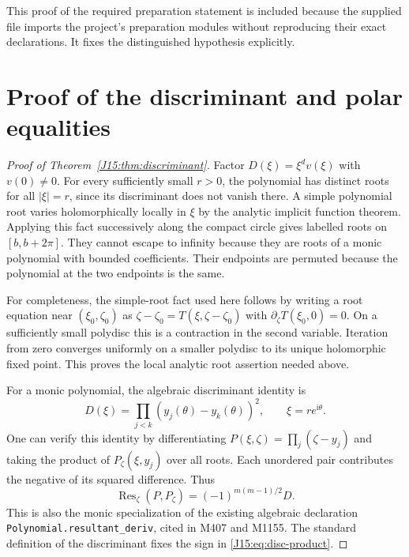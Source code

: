\documentclass[11pt,oneside]{report}
\theoremstyle{definition}
\numberwithin{equation}{section}
\newcommand{\decl}[1]{\textnormal{\nolinkurl{#1}}}
\newcommand{\Res}{\operatorname{Res}}
\newcommand{\ii}{\mathrm i}
\begin{document}
This proof of the required preparation statement is included because the
supplied file imports the project's preparation modules without reproducing
their exact declarations. It fixes the distinguished hypothesis explicitly.

\section{Proof of the discriminant and polar equalities}

\begin{proof}[Proof of Theorem~\ref{J15:thm:discriminant}]
Factor $D(\xi)=\xi^d v(\xi)$ with $v(0)\ne0$.
For every sufficiently small $r>0$, the polynomial has distinct roots for
all $|\xi|=r$, since its discriminant does not vanish there.
A simple polynomial root varies holomorphically locally in $\xi$ by the
analytic implicit function theorem. Applying this fact successively along
the compact circle gives labelled roots on $[b,b+2\pi]$. They cannot
escape to infinity because they are roots of a monic polynomial with
bounded coefficients. Their endpoints are permuted because the polynomial
at the two endpoints is the same.

For completeness, the simple-root fact used here follows by writing a
root equation near $(\xi_0,\zeta_0)$ as
$\zeta-\zeta_0=T(\xi,\zeta-\zeta_0)$ with
$\partial_\zeta T(\xi_0,0)=0$. On a sufficiently small polydisc this
is a contraction in the second variable. Iteration from zero converges
uniformly on a smaller polydisc to its unique holomorphic fixed point.
This proves the local analytic root assertion needed above.

For a monic polynomial, the algebraic discriminant identity is
\begin{equation}\label{J15:eq:disc-product}
 D(\xi)=\prod_{j<k}(y_j(\theta)-y_k(\theta))^2,
 \qquad \xi=r e^{\ii\theta}.
\end{equation}
One can verify this identity by differentiating
$P(\xi,\zeta)=\prod_j(\zeta-y_j)$ and taking the product of
$P_\zeta(\xi,y_j)$ over all roots. Each unordered pair contributes
the negative of its squared difference. Thus
\begin{equation}\label{J15:eq:resultant}
 \Res_\zeta(P,P_\zeta)=(-1)^{m(m-1)/2}D.
\end{equation}
This is also the monic specialization of the existing algebraic declaration
\decl{Polynomial.resultant_deriv}, cited in M407 and M1155.
The standard definition of the discriminant fixes the sign in
\eqref{J15:eq:disc-product}.


\end{proof}
\end{document}
